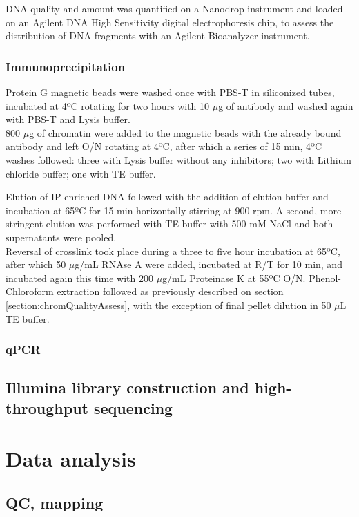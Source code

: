 \documentclass[11pt,twoside,a4paper]{report}
\begin{document}
			DNA quality and amount was quantified on a Nanodrop instrument and loaded on an Agilent DNA High Sensitivity digital electrophoresis chip, to assess the distribution of DNA fragments with an Agilent Bioanalyzer instrument.
			
			\subsubsection{Immunoprecipitation}
			Protein G magnetic beads were washed once with PBS-T in siliconized tubes, incubated at 4ºC rotating for two hours with 10 $\mu$g of antibody and washed again with PBS-T and Lysis buffer. \\
			
			800 $\mu$g of chromatin were added to the magnetic beads with the already bound antibody and left O/N rotating at 4ºC, after which a series of 15 min, 4ºC washes followed: three with Lysis buffer without any inhibitors; two with Lithium chloride buffer; one with TE buffer.
			
			Elution of IP-enriched DNA followed with the addition of elution buffer and incubation at 65ºC for 15 min horizontally stirring at 900 rpm. A second, more stringent elution was performed with TE buffer with 500 mM NaCl and both supernatants were pooled. \\
			
			Reversal of crosslink took place during a three to five hour incubation at 65ºC, after which 50 $\mu$g/mL RNAse A were added, incubated at R/T for 10 min, and incubated again this time with 200 $\mu$g/mL Proteinase K at 55ºC O/N. Phenol-Chloroform extraction followed as previously described on section \ref{section:chromQualityAssess}, with the exception of final pellet dilution in 50 $\mu$L TE buffer.
			
			\subsubsection{qPCR}
		
		
		\subsection{Illumina library construction and high-throughput sequencing}
		
	\section{Data analysis}
		\subsection{QC, mapping}
\end{document}
